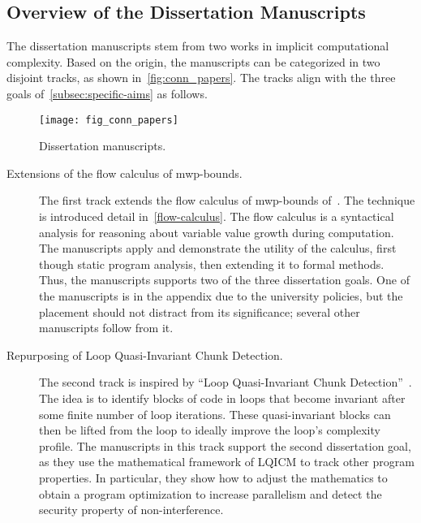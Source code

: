 \subsection{Overview of the Dissertation Manuscripts}
\label{subsec:conn-papers}

The dissertation manuscripts stem from two works in implicit computational complexity.
Based on the origin, the manuscripts can be categorized in two disjoint tracks, as shown in~\autoref{fig:conn_papers}.
The tracks align with the three goals of~\autoref{subsec:specific-aims} as follows.

\begin{figure}[p]
    \texttt{[image: fig\_conn\_papers]}
    \caption[Dissertation manuscripts]{Dissertation manuscripts.}
    \label{fig:conn_papers}
\end{figure}

\begin{description}
\item[Extensions of the flow calculus of mwp-bounds.]
The first track extends the flow calculus of mwp-bounds of~\textcite{jones2009}.
The technique is introduced detail in~\autoref{flow-calculus}.
The flow calculus is a syntactical analysis for reasoning about variable value growth during computation.
The manuscripts apply and demonstrate the utility of the calculus, first though static program analysis, then extending it to formal methods.
Thus, the manuscripts supports two of the three dissertation goals.
One of the manuscripts is in the appendix due to the university policies, but the placement should not distract from its significance;
several other manuscripts follow from it.

\item[Repurposing of Loop Quasi-Invariant Chunk Detection.]
The second track is inspired by \enquote{Loop Quasi-Invariant Chunk Detection}~\cite{moyen20172}.
The idea is to identify blocks of code in loops that become invariant after some finite number of loop iterations.
These quasi-invariant blocks can then be lifted from the loop to ideally improve the loop's complexity profile.
The manuscripts in this track support the second dissertation goal,
as they use the mathematical framework of LQICM to track other program properties.
In particular, they show how to adjust the mathematics to obtain a program optimization to increase parallelism and detect the security property of non-interference.
\end{description}

